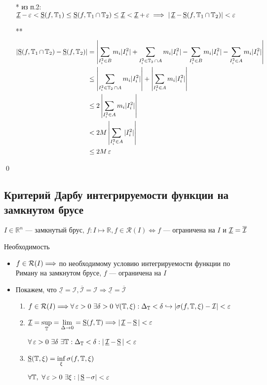 \documentclass[a4paper]{article}
\begin{document}
\begin{itemize}
    \item[*] из п.2: $\operatorname{\underline{\mathcal{I}}} - \operatorname{\varepsilon} < \operatorname{\underline{S}}(f, \operatorname{\mathbb{T}}_1) \le \operatorname{\underline{S}}(f, \operatorname{\mathbb{T}}_1\cap \operatorname{\mathbb{T}}_2) \le \operatorname{\underline{\mathcal{I}}} < \operatorname{\underline{\mathcal{I}}} + \operatorname{\varepsilon} \implies |\operatorname{\underline{\mathcal{I}}} - \operatorname{\underline{S}}(f, \operatorname{\mathbb{T}}_1\cap\operatorname{\mathbb{T}}_2)| < \operatorname{\varepsilon}$\\
    \item[**] \begin{equation*}
        \begin{aligned}
            \left|\us(f, \T_1\cap\T_2) - \us(f, \T_2)\right| &= \left|\sum_{I_i^2\in B}m_i|I_i^2| + \sum_{I_i^2\in \T_2\cap A}m_i|I_i^2| - \sum_{I_i^2\in B}m_i|I_i^2| - \sum_{I_i^2\in A}m_i|I_i^2|\right|\\
            &\le \left|\sum_{I_i^2\in \T_2\cap A}m_i|I_i^2|\right| + \left|\sum_{I_i^2\in A}m_i|I_i^2|\right|\\
            &\le 2\left|\sum_{I_i^2\in A}m_i|I_i^2|\right|\\
            &< 2M\left|\sum_{I_i^2\in A}|I_i^2|\right|\\
            &\le 2M\ve
        \end{aligned}
    \end{equation*}
\end{itemize}\qed


\subsection{Критерий Дарбу интегрируемости функции на замкнутом брусе}
$I\in\mathbb{R}^n\text{ — замкнутый брус, } f:I\mapsto \mathbb{R}, f\in \mathcal{R}(I)\Longleftrightarrow f$ — ограничена на $I$ и $\operatorname{\underline{\mathcal{I}}}=\operatorname{\overline{\mathcal{I}}}$

\proof Необходимость 
\begin{itemize}
    \item $f\in\mathcal{R}(I)\Longrightarrow$ по необходимому условию интегрируемости функции по Риману на замкнутом брусе, $f$ — ограничена на $I$
    \item Покажем, что $\underline{\mathcal{I}}=\mathcal{I},\overline{\mathcal{I}}=\mathcal{I}\Longrightarrow\underline{\mathcal{I}}=\overline{\mathcal{I}}$
    
    \begin{enumerate}
        \item $f\in\mathcal{R}(I)\Longrightarrow\forall \operatorname{\varepsilon} >0\ \exists \delta >0\ \forall(\mathbb{T},\xi):\Delta_{\mathbb{T}}<\delta\hookrightarrow|\sigma(f,\mathbb{T},\xi)-\mathcal{I}|<\operatorname{\varepsilon}$
        \item $\operatorname{\underline{\mathcal{I}}}=\sup\limits_{\mathbb{T}}=\lim\limits_{\Delta\rightarrow 0}=\operatorname{\underline{S}}(f,\mathbb{T})\Longrightarrow |\operatorname{\underline{\mathcal{I}}}-\operatorname{\underline{S}}|<\operatorname{\varepsilon}$
        
        $\forall \operatorname{\varepsilon}>0\ \exists\delta\ \exists\mathbb{T}:\Delta_{\mathbb{T}}<\delta: |\operatorname{\underline{\mathcal{I}}}-\operatorname{\underline{S}}|<\operatorname{\varepsilon}$
        \item $\operatorname{\underline{S}}(\mathbb{T},\xi)=\inf\limits_{\xi}\sigma(f,\mathbb{T},\xi)$
        
        $\forall\mathbb{T},\ \forall \operatorname{\varepsilon}>0\ \exists \xi:|\operatorname{\underline{S}}-\sigma|<\operatorname{\varepsilon}$
    \end{enumerate}
\end{itemize}
\end{document}
